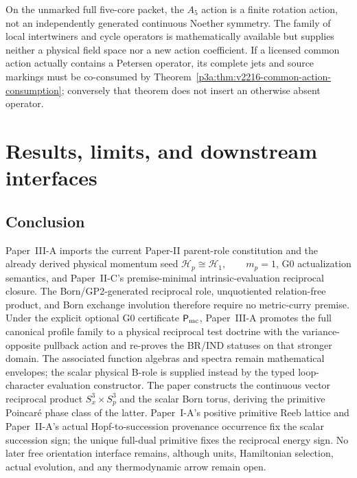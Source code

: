 \documentclass[12pt,a4paper]{article}
\begin{document}
\begin{proposition}
\label{p3a:prop:v319-petersen-action-firewall}
On the unmarked full five-core packet, the $A_5$ action is a finite
rotation action, not an independently generated continuous Noether
symmetry.  The family of local intertwiners and cycle operators is
mathematically available but supplies neither a physical field space
nor a new action coefficient.  If a licensed common action actually
contains a Petersen operator, its complete jets and source markings
must be co-consumed by
Theorem~\ref{p3a:thm:v2216-common-action-consumption}; conversely that
theorem does not insert an otherwise absent operator.
\end{proposition}

\section{Results, limits, and downstream interfaces}
\label{paper3a:sec:organized-conclusion}
\subsection{Conclusion}
\label{p3a:sec:conclusion}
Paper~III-A imports the current Paper-II parent-role constitution and the
already derived physical momentum seed
\(\mathcal H_p\cong\mathcal H_1,\qquad m_p=1\), G0 actualization semantics,
and Paper~II-C's premise-minimal intrinsic-evaluation reciprocal closure.  The
Born/GP2-generated reciprocal role, unquotiented relation-free product, and Born
exchange involution therefore require no metric-curry premise.  Under the
explicit optional G0 certificate $\mathsf P_{\rm mc}$, Paper~III-A promotes
the full canonical profile family to a physical reciprocal test doctrine with
the variance-opposite pullback action and re-proves the BR/IND statuses on
that stronger domain.  The associated function algebras and spectra remain
mathematical envelopes; the scalar physical B-role is supplied instead by the
typed loop-character evaluation constructor.  The paper
constructs the continuous vector reciprocal product $S^3_x\times S^3_p$ and
the scalar Born torus, deriving the primitive Poincar\'e phase class of the
latter.  Paper~I-A's positive primitive Reeb lattice and Paper~II-A's actual
Hopf-to-succession provenance occurrence fix the scalar succession sign; the
unique full-dual primitive fixes the reciprocal energy sign.  No later free
orientation interface remains, although units, Hamiltonian selection, actual
evolution, and any thermodynamic arrow remain open.
\end{document}
